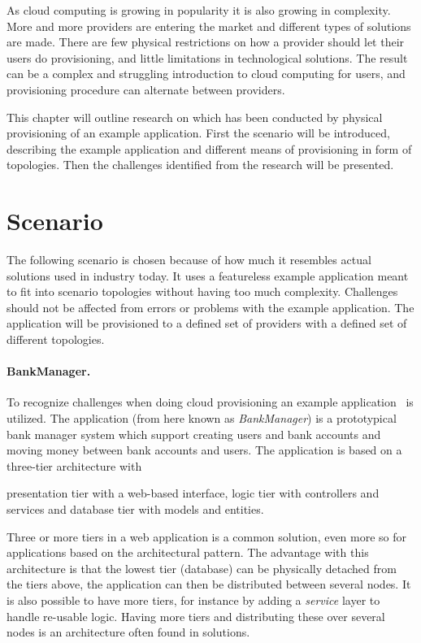 
As cloud computing is growing in popularity it is also growing in complexity.
More and more providers are entering the market and different types of solutions are made.
There are few physical restrictions on how a provider should let their users do provisioning,
and little limitations in technological solutions.
The result can be a complex and struggling introduction to cloud computing for users,
and provisioning procedure can alternate between providers.

This chapter will outline research on which has been conducted by
physical provisioning of an example application.
First the scenario will be introduced, describing the example application
and different means of provisioning in form of topologies.
Then the challenges identified from the research will be presented.

\section{Scenario}

The following scenario is chosen because of how much it resembles actual solutions
used in industry today.
It uses a featureless example application meant to fit into scenario topologies
without having too much complexity.
Challenges should not be affected from errors or problems with the example application.
The application will be provisioned to a defined set of providers with a defined set of different topologies.

\paragraph{BankManager.}

To recognize challenges when doing cloud provisioning an example application~\cite{BankManager} is utilized.
The application (from here known as \emph{BankManager}) is a prototypical bank manager system
which support creating users and bank accounts and moving money between bank accounts and users.
The application is based on a three-tier architecture with 
\begin{ii} 
  \iitem presentation tier with a web-based interface,
  \iitem logic tier with controllers and services and
  \iitem database tier with models and entities.
\end{ii}
Three or more tiers in a web application is a common solution, even more so for applications 
based on the  architectural pattern.
The advantage with this architecture is that the lowest tier (database) can be physically
detached from the tiers above, the application can then be distributed between several nodes.
It is also possible to have more tiers, for instance by adding a \emph{service} 
layer to handle re-usable logic.
Having more tiers and distributing these over several nodes is an architecture often
found in  solutions.

